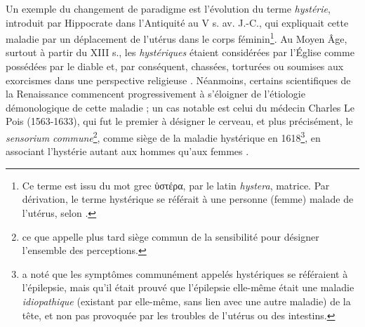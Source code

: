 
\label{hysterie} Un exemple du changement de paradigme est l'évolution du terme \textit{hystérie},  introduit par Hippocrate dans l'Antiquité au V\ieme{} s. av. J.-C., qui expliquait cette maladie par un déplacement de l'utérus dans le corps féminin\footnote{Ce terme est issu du mot grec \foreignlanguage{greek}{ὑστέρα}, par le latin \textit{hystera}, \og{}matrice\fg{}. Par dérivation, le terme hystérique se référait à une personne \og{}(femme) malade de l'utérus\fg{}, selon \cite{rey2011dictionnaire}.}. Au Moyen Âge, surtout à partir du XIII\ieme{} s., les \textit{hystériques} étaient considérées par l'Église comme possédées par le diable et, par conséquent, chassées, torturées ou soumises aux exorcismes dans une perspective religieuse \citep{tasca2012women}. Néanmoins, certains scientifiques de la Renaissance commencent progressivement à s'éloigner de l'étiologie démonologique de cette maladie ; un cas notable est celui du médecin Charles Le Pois (1563-1633), qui fut le premier à désigner le cerveau, et plus précisément, le \textit{sensorium commune}\footnote{ce que \citet{kant1863} appelle plus tard \og{}siège commun de la sensibilité\fg{} pour désigner l'ensemble des perceptions.}, comme siège de la maladie hystérique en 1618\footnote{\citet[p. 101]{lepois1618} a noté que les symptômes communément appelés hystériques se référaient à l'épilepsie, mais qu'il était prouvé que l'épilepsie elle-même était une maladie \textit{idiopathique} (existant par elle-même, sans lien avec une autre maladie) de la tête, et non pas provoquée par les troubles de l'utérus ou des intestins.}, en associant l'hystérie autant aux hommes qu'aux femmes \citep{wright1980}.  

